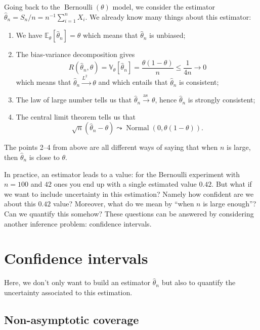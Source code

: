 \documentclass[
	fontsize=11pt, %
	twoside=false, %
	numbers=noenddot, %
]{kaobook}
\DeclareMathOperator{\ber}{Bernoulli}
\DeclareMathOperator{\nor}{Normal}
\newcommand{\E}{\mathbb E}
\newcommand{\var}{\mathbb V}
\newcommand{\wh}{\widehat}
\newcommand{\goas}{\overset{\text{as\ }}{\rightarrow}}
\newcommand{\goqr}{\overset{\text{$L^2$\ }}{\rightarrow}}
\begin{document}
Going back to the $\ber(\theta)$ model, we consider the estimator $\wh \theta_n = S_n / n = n^{-1} \sum_{i=1}^n X_i$.
We already know many things about this estimator:
\begin{enumerate}
	\item We have $\E_\theta [\wh \theta_n] = \theta$ which means that $\wh \theta_n$ is unbiased;
	\item The bias-variance decomposition gives
	\begin{equation}
		\label{eq:bernoulli-quadratic-risk}
	 	R(\wh \theta_n, \theta) = \var_\theta[\wh \theta_n] = \frac{\theta (1 - \theta)}{n} \leq 
	 	\frac{1}{4 n} \rightarrow 0
	 \end{equation}
	 which means that $\wh \theta_n \goqr \theta$ and which entails that $\wh \theta_n$ is consistent;
	\item The law of large number tells us that $\wh \theta_n \goas \theta$, hence $\wh \theta_n$ is strongly consistent;
	\item The central limit theorem tells us that
	\begin{equation}
	\label{eq:tcl-bernoulli}
	\sqrt n (\wh \theta_n - \theta) \leadsto \nor(0, \theta(1 - \theta)).
	\end{equation}
\end{enumerate}
The points 2--4 from above are all different ways of saying that when $n$ is large, then $\wh \theta_n$ is close to $\theta$.

In practice, an estimator leads to a value: for the Bernoulli experiment with $n=100$ and $42$ ones you end up with a single estimated value $0.42$.
But what if we want to include uncertainty in this estimation?
Namely how confident are we about this $0.42$ value?
Moreover, what do we mean by ``when $n$ is large enough''? 
Can we quantify this somehow?
These questions can be answered by considering another inference problem: confidence intervals.

\section{Confidence intervals} %
\label{sec:confidence_intervals}

Here, we don't only want to build an estimator $\wh \theta_n$ but also to quantify the uncertainty associated to this estimation.

\subsection{Non-asymptotic coverage} %
\label{sub:non_asymptotic_coverage}
\end{document}
